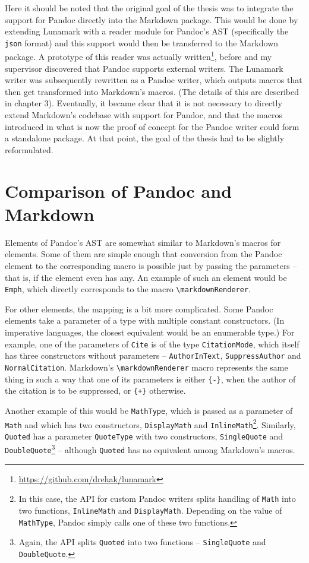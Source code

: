 \documentclass[
  digital,     %
  oneside,     %
  nosansbold,  %
  nocolorbold, %
  lof,         %
  nolot,       %
]{fithesis4}
\newcommand\macro[1]{\texttt{\textbackslash{}{#1}}}
\newcommand\renderer[1]{\macro{markdown\-Renderer\-{#1}}}
\begin{document}
Here it should be noted that the original goal of the thesis was to integrate the support for Pandoc directly into the Markdown package. This would be done by extending Lunamark with a reader module for Pandoc's AST (specifically the \texttt{json} format) and this support would then be transferred to the Markdown package. A prototype of this reader was actually written\footnote{\url{https://github.com/drehak/lunamark}}, before and my supervisor discovered that Pandoc supports external writers. The Lunamark writer was subsequently rewritten as a Pandoc writer, which outputs macros that then get transformed into Markdown's macros. (The details of this are described in chapter 3). Eventually, it became clear that it is not necessary to directly extend Markdown's codebase with support for Pandoc, and that the macros introduced in what is now the proof of concept for the Pandoc writer could form a standalone package. At that point, the goal of the thesis had to be slightly reformulated.

\section{Comparison of Pandoc and Markdown}

Elements of Pandoc's AST are somewhat similar to Markdown's macros for elements. Some of them are simple enough that conversion from the Pandoc element to the corresponding macro is possible just by passing the parameters -- that is, if the element even has any. An example of such an element would be \texttt{Emph}, which directly corresponds to the macro \renderer{Emphasis}.

For other elements, the mapping is a bit more complicated. Some Pandoc elements take a parameter of a type with multiple constant constructors. (In imperative languages, the closest equivalent would be an enumerable type.) For example, one of the parameters of \texttt{Cite} is of the type \texttt{CitationMode}, which itself has three constructors without parameters -- \texttt{AuthorInText}, \texttt{SuppressAuthor} and \texttt{NormalCitation}. Markdown's \renderer{Cite} macro represents the same thing in such a way that one of its parameters is either \texttt{\{-\}}, when the author of the citation is to be suppressed, or \texttt{\{+\}} otherwise.

Another example of this would be \texttt{MathType}, which is passed as a parameter of \texttt{Math} and which has two constructors, \texttt{DisplayMath} and \texttt{InlineMath}\footnote{In this case, the API for custom Pandoc writers splits handling of \texttt{Math} into two functions, \texttt{InlineMath} and \texttt{DisplayMath}. Depending on the value of \texttt{MathType}, Pandoc simply calls one of these two functions.}. Similarly, \texttt{Quoted} has a parameter \texttt{QuoteType} with two constructors, \texttt{SingleQuote} and \texttt{DoubleQuote}\footnote{Again, the API splits \texttt{Quoted} into two functions -- \texttt{SingleQuote} and \texttt{DoubleQuote}.} -- although \texttt{Quoted} has no equivalent among Markdown's macros.
\end{document}
